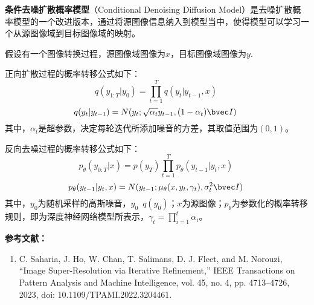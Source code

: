 
\textbf{条件去噪扩散概率模型}（Conditional Denoising Diffusion Model）是去噪扩散概率模型的一个改进版本，通过将源图像信息纳入到模型当中，使得模型可以学习一个从源图像域到目标图像域的映射。

假设有一个图像转换过程，源图像域图像为$x$，目标图像域图像为$y$.

正向扩散过程的概率转移公式如下：
\begin{equation}
q({y_{1:T}}|{y_0}) = \prod\limits_{t = 1}^T {q({y_t}|{y_{t - 1},x})}~
\end{equation}
\begin{equation}
q({y_t}|{y_{t - 1}}) = {N}({y_t};\sqrt {\alpha_t} {y_{t - 1}},(1-\alpha_t) \bvec I)~
\end{equation}
其中，$\alpha_t$是超参数，决定每轮迭代所添加噪音的方差，其取值范围为$(0,1)$。


反向去噪过程的概率转移公式如下：
\begin{equation}
{p_\theta }({y_{0:T}|x}) = p({y_T})\prod\limits_{t = 1}^T {{p_\theta }({y_{t - 1}}|{y_t,x})}~
\end{equation}
\begin{equation}
{p_\theta }({y_{t - 1}}|{y_t,x}) = N({y_{t - 1}};{\mu _\theta }({x,y_t,\gamma_t}),\sigma_t^2 \bvec I)~
\end{equation}
其中，$y_0$为随机采样的高斯噪音，$y_0$~$q(y_0)$；$x$为源图像；$p_\theta$为参数化的概率转移规则，即为深度神经网络模型所表示，$\gamma_t=\prod\limits_{i=1}^t\alpha_i$。


\textbf{参考文献：}
\begin{enumerate}
\item C. Saharia, J. Ho, W. Chan, T. Salimans, D. J. Fleet, and M. Norouzi, “Image Super-Resolution via Iterative Refinement,” IEEE Transactions on Pattern Analysis and Machine Intelligence, vol. 45, no. 4, pp. 4713–4726, 2023, doi: 10.1109/TPAMI.2022.3204461.
\end{enumerate}